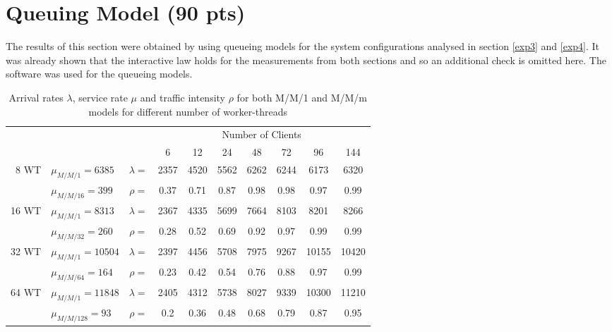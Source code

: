 \documentclass[report.tex]{subfiles}
\begin{document}
\section{Queuing Model (90 pts)}

The results of this section were obtained by using queueing models for the system configurations analysed in section \ref{exp3} and \ref{exp4}. It was already shown that the interactive law holds for the measurements from both sections and so an additional check is omitted here.
The software \cite{queueing} was used for the queueing models.


\begin{table}[H]
	\centering
	\small{
	\begin{tabular}{r|lcccccccc|}
		\multicolumn{3}{c}{}  & \multicolumn{7}{c}{Number of Clients}\Tstrut \\ 
		\multicolumn{3}{c}{}   & 6 & 12 & 24 & 48 & 72 & 96 & \multicolumn{1}{c}{144} \\ 
		\cline{2-10}
		\multirow{2}{*}{8 WT } & $\mu_{M/M/1} = 6385$ & $\lambda = $ & 2357 & 4520 & 5562 & 6262 & 6244 & 6173 & 6320\Tstrut \\
		& $\mu_{M/M/16} = 399$ & $\rho =$ & 0.37 & 0.71 & 0.87 & 0.98 & 0.98 & 0.97 & 0.99 \\
		\cline{2-10}
		\multirow{2}{*}{16 WT } & $\mu_{M/M/1} = 8313$ & $\lambda = $ & 2367 & 4335 & 5699 & 7664 & 8103 & 8201 & 8266\Tstrut \\
		& $\mu_{M/M/32} = 260$ & $\rho =$ & 0.28 & 0.52 & 0.69 & 0.92 & 0.97 & 0.99 & 0.99 \\
		\cline{2-10}
		\multirow{2}{*}{32 WT } & $\mu_{M/M/1} = 10504$ & $\lambda = $ & 2397 & 4456 & 5708 & 7975 & 9267 & 10155 & 10420\Tstrut \\
		& $\mu_{M/M/64} = 164$ & $\rho =$ & 0.23 & 0.42 & 0.54 & 0.76 & 0.88 & 0.97 & 0.99 \\
		\cline{2-10}
		\multirow{2}{*}{64 WT } & $\mu_{M/M/1} = 11848$ & $\lambda = $ & 2405 & 4312 & 5738 & 8027 & 9339 & 10300 & 11210\Tstrut \\
		& $\mu_{M/M/128} = 93$ & $\rho =$ & 0.2 & 0.36 & 0.48 & 0.68 & 0.79 & 0.87 & 0.95 \\
		\cline{2-10}
	\end{tabular}}
	\caption{Arrival rates $\lambda$, service rate $\mu$ and traffic intensity $\rho$ for both M/M/1 and M/M/m models for different number of worker-threads} \label{exp70_arrival_service_traffic} 
\end{table}
\end{document}
